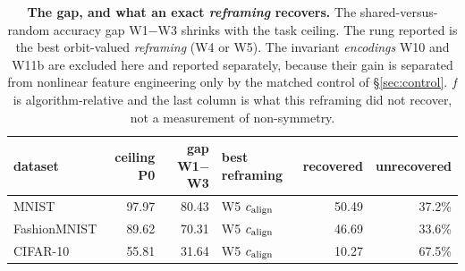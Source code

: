 \begin{table}[t]
\centering\small
\caption{\textbf{The gap, and what an exact \emph{reframing} recovers.} The shared-versus-random accuracy gap W1$-$W3 shrinks with the task ceiling. The rung reported is the best orbit-valued \emph{reframing} (W4 or W5). The invariant \emph{encodings} W10 and W11b are excluded here and reported separately, because their gain is separated from nonlinear feature engineering only by the matched control of \S\ref{sec:control}. $f$ is algorithm-relative and the last column is what this reframing did not recover, not a measurement of non-symmetry.}
\label{tab:gap}
\begin{tabular}{@{}lrrlrr@{}}
\toprule
dataset & ceiling P0 & gap W1$-$W3 & best reframing & recovered & unrecovered \\
\midrule
MNIST & 97.97 & 80.43 & W5 $c_{\mathrm{align}}$ & 50.49 & 37.2\% \\
FashionMNIST & 89.62 & 70.31 & W5 $c_{\mathrm{align}}$ & 46.69 & 33.6\% \\
CIFAR-10 & 55.81 & 31.64 & W5 $c_{\mathrm{align}}$ & 10.27 & 67.5\% \\
\bottomrule
\end{tabular}
\end{table}
